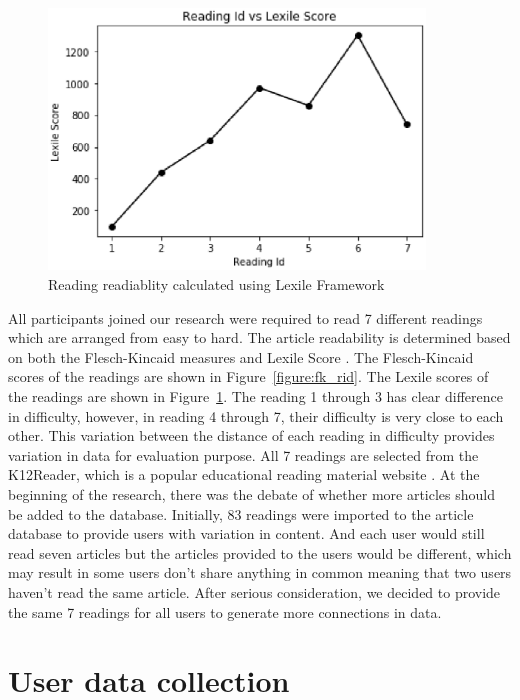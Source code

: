 \begin{figure}[tbp]
 \begin{center}
  \includegraphics[width=100mm]{data_lexile_rid.eps}
 \end{center}
 \caption{\label{figure:lexile_rid} Reading readiablity calculated using Lexile Framework}
\end{figure}

All participants joined our research were required to read 7 different readings which are arranged from easy to hard. The article readability is determined based on both the Flesch-Kincaid measures \cite{Kincaid1975} and Lexile Score \cite{Lexile1996}. The Flesch-Kincaid scores of the readings are shown in Figure~\ref{figure:fk_rid}. The Lexile scores of the readings are shown in Figure~\ref{figure:lexile_rid}. The reading 1 through 3 has clear difference in difficulty, however, in reading 4 through 7, their difficulty is very close to each other. This variation between the distance of each reading in difficulty provides variation in data for evaluation purpose. All 7 readings are selected from the K12Reader, which is a popular educational reading material website \cite{K12Reader}. At the beginning of the research, there was the debate of whether more articles should be added to the database. Initially, 83 readings were imported to the article database to provide users with variation in content. And each user would still read seven articles but the articles provided to the users would be different, which may result in some users don't share anything in common meaning that two users haven't read the same article. After serious consideration, we decided to provide the same 7 readings for all users to generate more connections in data.

\section{User data collection}

